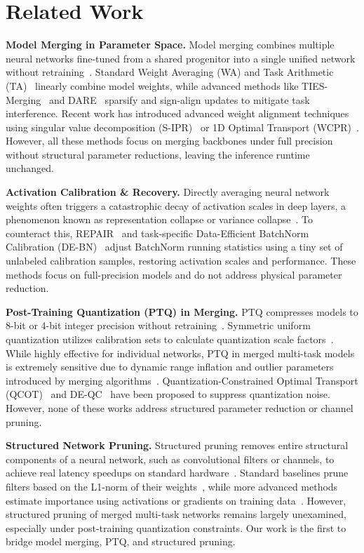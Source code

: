 \documentclass{article}
\theoremstyle{plain}
\theoremstyle{definition}
\theoremstyle{remark}
\begin{document}
\section{Related Work}
\label{sec:related}
\textbf{Model Merging in Parameter Space.} Model merging combines multiple neural networks fine-tuned from a shared progenitor into a single unified network without retraining~\cite{wortsman2022model}. Standard Weight Averaging (WA) and Task Arithmetic (TA)~\cite{ilharco2022editing} linearly combine model weights, while advanced methods like TIES-Merging~\cite{yadav2023ties} and DARE~\cite{jin2023dare} sparsify and sign-align updates to mitigate task interference. Recent work has introduced advanced weight alignment techniques using singular value decomposition (S-IPR)~\cite{anonymous2026b} or 1D Optimal Transport (WCPR)~\cite{anonymous2026c}. However, all these methods focus on merging backbones under full precision without structural parameter reductions, leaving the inference runtime unchanged.

\textbf{Activation Calibration \& Recovery.} Directly averaging neural network weights often triggers a catastrophic decay of activation scales in deep layers, a phenomenon known as representation collapse or variance collapse~\cite{jordan2023repair}. To counteract this, REPAIR~\cite{jordan2023repair} and task-specific Data-Efficient BatchNorm Calibration (DE-BN)~\cite{anonymous2026a,anonymous2026b} adjust BatchNorm running statistics using a tiny set of unlabeled calibration samples, restoring activation scales and performance. These methods focus on full-precision models and do not address physical parameter reduction.

\textbf{Post-Training Quantization (PTQ) in Merging.} PTQ compresses models to 8-bit or 4-bit integer precision without retraining~\cite{gholami2021survey,nagel2021white}. Symmetric uniform quantization utilizes calibration sets to calculate quantization scale factors~\cite{banner2019post}. While highly effective for individual networks, PTQ in merged multi-task models is extremely sensitive due to dynamic range inflation and outlier parameters introduced by merging algorithms~\cite{anonymous2026c}. Quantization-Constrained Optimal Transport (QCOT)~\cite{anonymous2026c} and DE-QC~\cite{anonymous2026b} have been proposed to suppress quantization noise. However, none of these works address structured parameter reduction or channel pruning.

\textbf{Structured Network Pruning.} Structured pruning removes entire structural components of a neural network, such as convolutional filters or channels, to achieve real latency speedups on standard hardware~\cite{li2016pruning,he2017channel}. Standard baselines prune filters based on the L1-norm of their weights~\cite{li2016pruning}, while more advanced methods estimate importance using activations or gradients on training data~\cite{molchanov2019importance}. However, structured pruning of merged multi-task networks remains largely unexamined, especially under post-training quantization constraints. Our work is the first to bridge model merging, PTQ, and structured pruning.
\end{document}
